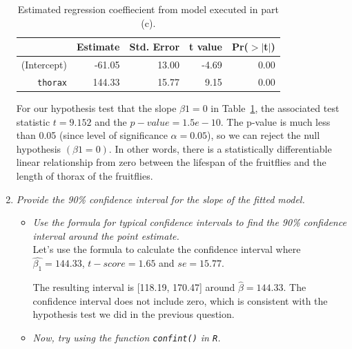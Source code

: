 \documentclass[12pt,letterpaper]{article}
\begin{document}
\begin{enumerate}[label=(\alph*)]
	\begin{table}[h!]
\centering
\caption{Estimated regression coeffiecient from model executed in part (c).}
\label{tab:1}
\begin{tabular}{rrrrr}
  \hline
 & Estimate & Std. Error & t value & Pr($>$$|$t$|$) \\ 
  \hline
(Intercept) & -61.05 & 13.00 & -4.69 & 0.00 \\ 
  \texttt{thorax} & 144.33 & 15.77 & 9.15 & 0.00 \\ 
   \hline
\end{tabular}
\end{table}
		\vspace{.25cm}
For our hypothesis test that the slope $\beta 1=0$ in Table~\ref{tab:1}, the associated test statistic $t = 9.152$ and the $p-value = 1.5e-10$. The p-value is much less than 0.05 (since level of significance $\alpha = 0.05$), so we can reject the null hypothesis $(\beta 1 = 0)$. In other words, there is a statistically differentiable linear relationship from zero between the lifespan of the fruitflies and the length of thorax of the fruitflies. 

		\vspace{.25cm}
	\item \emph{Provide the 90\% confidence interval for the slope of the fitted model.}
	
			\vspace{.15cm}
	\begin{itemize}
		\item
			\emph{Use the formula for typical confidence intervals to find the 90\% confidence interval around the point estimate.}	\\
			
			
			Let's use the formula to calculate the confidence interval where $\hat{\beta_{1}} = 144.33$, $t-score = 1.65$ and $se = 15.77$. \\
						\vspace{.15cm}
			  
			\vspace{.25cm}
			
			The resulting interval is [118.19, 170.47] around $\hat{\beta}=144.33$.  The confidence interval does not include zero, which is consistent with the hypothesis test we did in the previous question. 
			\vspace{.15cm}
		\item
		\emph{Now, try using the function  \texttt{confint()}  in \texttt{R}.}\\
		

\end{itemize}
\end{enumerate}
\end{document}
